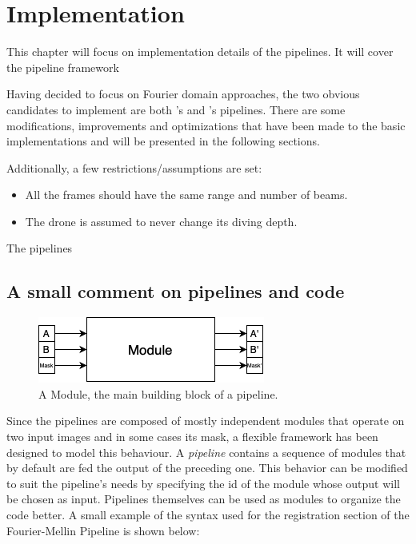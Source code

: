 \chapter{Implementation}
\label{chap:implementation}

This chapter will focus on implementation details of the pipelines. It will cover the pipeline framework

Having decided to focus on Fourier domain approaches, the two obvious candidates to implement are both \citeauthor{Reddy1996}'s and \citeauthor{Hurtos2015}'s pipelines. There are some modifications, improvements and optimizations that have been made to the basic implementations and will be presented in the following sections.

Additionally, a few restrictions/assumptions are set:

\begin{itemize}
    \item All the frames should have the same range and number of beams. 
    \item The drone is assumed to never change its diving depth.
\end{itemize}

The pipelines

\section{A small comment on pipelines and code}

\begin{figure}[H] 
  \centering
  \includegraphics[width=.5\textwidth]{figures/Module.png}
  \caption{A Module, the main building block of a pipeline.}
\end{figure}

Since the pipelines are composed of mostly independent modules that operate on two input images and in some cases its mask, a flexible framework has been designed to model this behaviour. A \textit{pipeline} contains a sequence of modules that by default are fed the output of the preceding one. This behavior can be modified to suit the pipeline's needs by specifying the id of the module whose output will be chosen as input. Pipelines themselves can be used as modules to organize the code better. A small example of the syntax used for the registration section of the Fourier-Mellin Pipeline is shown below:

